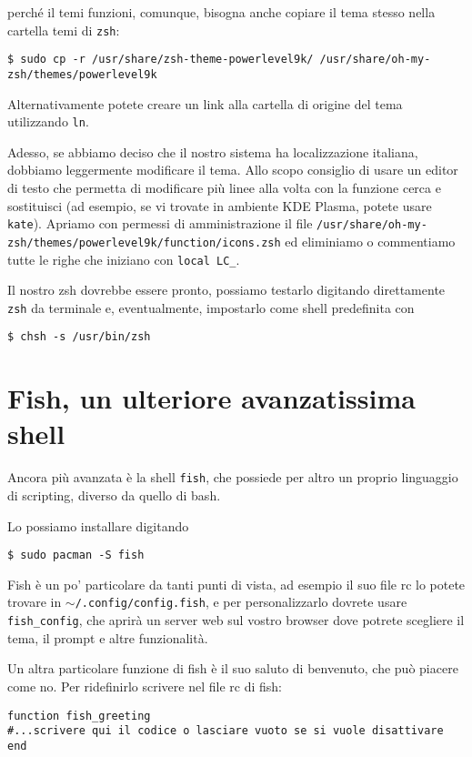 \documentclass[twoside,italian]{book}
\newcommand{\code}[1]{\texttt{#1}}
\begin{document}
    perché il temi funzioni, comunque, bisogna anche copiare il tema stesso nella cartella temi di \code{zsh}:
    \begin{lstlisting}
$ sudo cp -r /usr/share/zsh-theme-powerlevel9k/ /usr/share/oh-my-zsh/themes/powerlevel9k
    \end{lstlisting}
    Alternativamente potete creare un link alla cartella di origine del tema utilizzando \code{ln}.
    
    Adesso, se abbiamo deciso che il nostro sistema ha localizzazione italiana, dobbiamo leggermente modificare il tema. Allo scopo consiglio di usare un editor di testo che permetta di modificare più linee alla volta con la funzione cerca e sostituisci (ad esempio, se vi trovate in ambiente KDE Plasma, potete usare \code{kate}). Apriamo con permessi di amministrazione il file \code{/usr/share/oh-my-zsh/themes/powerlevel9k/function/icons.zsh} ed eliminiamo o commentiamo tutte le righe che iniziano con \code{local LC\_}.
    
    Il nostro zsh dovrebbe essere pronto, possiamo testarlo digitando direttamente \code{zsh} da terminale e, eventualmente, impostarlo come shell predefinita con 
    \begin{lstlisting}
$ chsh -s /usr/bin/zsh
    \end{lstlisting}
    
\section{Fish, un ulteriore avanzatissima shell}
    
    Ancora più avanzata è la shell \code{fish}, che possiede per altro un proprio linguaggio di scripting, diverso da quello di bash.
    
    Lo possiamo installare digitando 
    \begin{lstlisting}
$ sudo pacman -S fish
    \end{lstlisting}
    
    Fish è un po' particolare da tanti punti di vista, ad esempio il suo file rc lo potete trovare in \code{$\sim$/.config/config.fish}, e per personalizzarlo dovrete usare \code{fish\_config}, che aprirà un server web sul vostro browser dove potrete scegliere il tema, il prompt e altre funzionalità.
    
    Un altra particolare funzione di fish è il suo saluto di benvenuto, che può piacere come no. Per ridefinirlo scrivere nel file rc di fish:
\begin{lstlisting}
function fish_greeting
#...scrivere qui il codice o lasciare vuoto se si vuole disattivare
end
\end{lstlisting}
    
\end{document}

